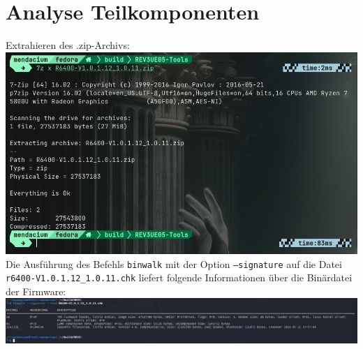 \documentclass{article}
\begin{document}
	\section*{Analyse Teilkomponenten}
	Extrahieren des .zip-Archivs:\\
	\includegraphics[width=0.5\linewidth]{"pictures/1.1 Extract.png"}\\
	Die Ausführung des Befehls \texttt{binwalk} mit der Option \texttt{--signature} auf die Datei \texttt{r6400-V1.0.1.12\_1.0.11.chk} liefert folgende Informationen über die Binärdatei der Firmware:\\
	\includegraphics[width=1\linewidth]{"pictures/1.2 signature.png"}\\
\end{document}

